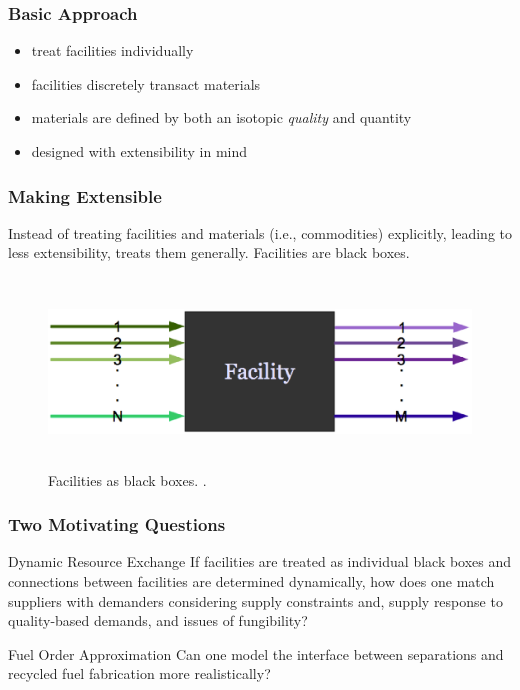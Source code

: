 \begin{frame}[ctb!]
  \frametitle{Basic \Cyclus Approach}

  \begin{itemize}
    \item treat facilities individually
    \item facilities discretely transact materials
    \item materials are defined by both an isotopic \textit{quality} and
      quantity
    \item designed with extensibility in mind
  \end{itemize}

\end{frame}

\begin{frame}[ctb!]
  \frametitle{Making \Cyclus Extensible}
  
  Instead of treating facilities and materials (i.e., commodities) explicitly,
  leading to less extensibility, \Cyclus treats them generally. Facilities are
  black boxes.
  
  \begin{figure}
    \includegraphics[height=5cm]{./images/facs.eps}
    \caption{Facilities as black boxes. \cite{cyclus2012}.}
    \label{fig:facs}  
  \end{figure}

\end{frame}

\begin{frame}[ctb!]
  \frametitle{Two Motivating Questions}

  \begin{block}{Dynamic Resource Exchange}
    If facilities are treated as individual black boxes and connections between
    facilities are determined dynamically, how does one match suppliers with
    demanders considering supply constraints and, supply response to
    quality-based demands, and issues of fungibility?
  \end{block}

  \pause

  \begin{block}{Fuel Order Approximation}
    Can one model the interface between separations and recycled fuel
    fabrication more realistically?
  \end{block}

\end{frame}
